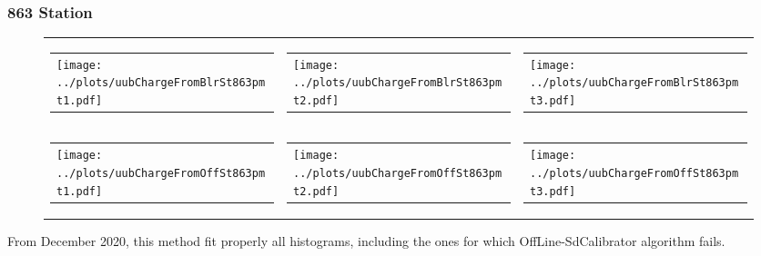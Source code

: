 \documentclass[aspectratio=169]{beamer}
\begin{document}
\begin{frame} 
  \frametitle{863 Station}
  \begin{figure}
    \centering
    \begin{tabularx}{\textwidth}{LCR}
      \begin{tabular}{l}
        \texttt{[image: ../plots/uubChargeFromBlrSt863pmt1.pdf]}
      \end{tabular}
      &
      \begin{tabular}{l}
        \texttt{[image: ../plots/uubChargeFromBlrSt863pmt2.pdf]}
      \end{tabular}
      &
      \begin{tabular}{l}
        \texttt{[image: ../plots/uubChargeFromBlrSt863pmt3.pdf]}
      \end{tabular}
      \\
      \begin{tabular}{l}
        \texttt{[image: ../plots/uubChargeFromOffSt863pmt1.pdf]}
      \end{tabular}
      &
      \begin{tabular}{l}
        \texttt{[image: ../plots/uubChargeFromOffSt863pmt2.pdf]}
      \end{tabular}
      &
      \begin{tabular}{l}
        \texttt{[image: ../plots/uubChargeFromOffSt863pmt3.pdf]}
      \end{tabular}
    \end{tabularx}
  \end{figure}
  From December 2020, this method fit properly all histograms,
  including the ones for which OffLine-SdCalibrator algorithm
  fails.
\end{frame}
\end{document}
